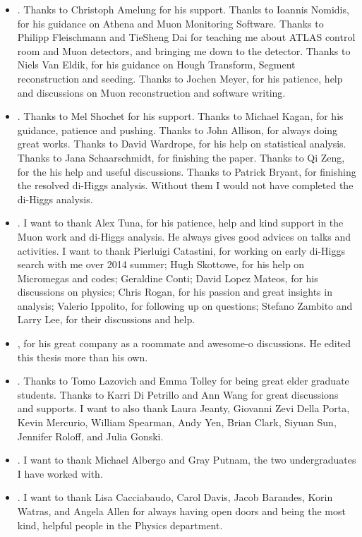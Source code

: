 \begin{itemize}
	\item {}. Thanks to Christoph Amelung for his support. Thanks to Ioannis Nomidis, for his guidance on Athena and Muon Monitoring Software. Thanks to Philipp Fleischmann and TieSheng Dai for teaching me about ATLAS control room and Muon detectors, and bringing me down to the detector. Thanks to Niels Van Eldik, for his guidance on Hough Transform, Segment reconstruction and seeding. Thanks to Jochen Meyer, for his patience, help and discussions on Muon reconstruction and software writing.
	\item {}. Thanks to Mel Shochet for his support. Thanks to Michael Kagan, for his guidance, patience and pushing. Thanks to John Allison, for always doing great works. Thanks to David Wardrope, for his help on statistical analysis. Thanks to Jana Schaarschmidt, for finishing the paper. Thanks to Qi Zeng, for the his help and useful discussions. Thanks to Patrick Bryant, for finishing the resolved di-Higgs analysis. Without them I would not have completed the di-Higgs analysis.
	\item {}. I want to thank Alex Tuna, for his patience, help and kind support in the Muon work and di-Higgs analysis. He always gives good advices on talks and activities. I want to thank Pierluigi Catastini, for working on early di-Higgs search with me over 2014 summer; Hugh Skottowe, for his help on Micromegas and codes; Geraldine Conti; David Lopez Mateos, for his discussions on physics; Chris Rogan, for his passion and great insights in analysis; Valerio Ippolito, for following up on questions; Stefano Zambito and Larry Lee, for their discussions and help.
	\item {}, for his great company as a roommate and awesome-o discussions. He edited this thesis more than his own.
	\item {}. Thanks to Tomo Lazovich and Emma Tolley for being great elder graduate students. Thanks to Karri Di Petrillo and Ann Wang for great discussions and supports. I want to also thank Laura Jeanty, Giovanni Zevi Della Porta, Kevin Mercurio, William Spearman, Andy Yen, Brian Clark, Siyuan Sun, Jennifer Roloff, and Julia Gonski.
	\item {}. I want to thank Michael Albergo and Gray Putnam, the two undergraduates I have worked with.
	\item {}. I want to thank Lisa Cacciabaudo, Carol Davis, Jacob Barandes, Korin Watras, and Angela Allen for always having open doors and being the most kind, helpful people in the Physics department. 

\end{itemize}
